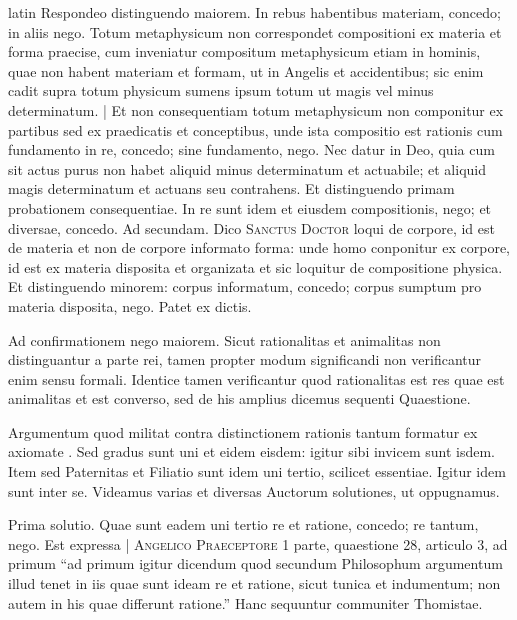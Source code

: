 \begin{otherlanguage*}{latin}
\pstart
Respondeo distinguendo maiorem. In rebus habentibus materiam, concedo; in aliis nego. Totum metaphysicum non correspondet compositioni ex materia et forma praecise, cum inveniatur compositum metaphysicum etiam in hominis, quae non habent materiam et formam, ut in Angelis et accidentibus; sic enim cadit supra totum physicum sumens ipsum totum ut magis vel minus determinatum. \textnormal{|} Et non consequentiam totum metaphysicum non componitur ex partibus sed ex praedicatis et conceptibus, unde ista compositio est rationis cum fundamento in re, concedo; sine fundamento, nego. Nec datur in Deo, quia cum sit actus purus non habet aliquid minus determinatum et actuabile; et aliquid magis determinatum et actuans seu contrahens. Et distinguendo primam probationem consequentiae. In re sunt idem et eiusdem compositionis, nego; et diversae, concedo. Ad secundam. Dico \textsc{Sanctus Doctor} loqui de corpore, id est de materia et non de corpore informato forma:
unde homo conponitur ex corpore, id est ex materia disposita et organizata et sic loquitur de compositione physica. Et distinguendo minorem:
corpus informatum, concedo; corpus sumptum pro materia disposita, nego. Patet ex dictis. 
\pend

\pstart
Ad confirmationem nego maiorem. Sicut rationalitas et animalitas non distinguantur a parte rei, tamen propter modum significandi non verificantur enim sensu formali. Identice tamen verificantur quod rationalitas est res quae est animalitas et est converso, sed de his amplius dicemus sequenti Quaestione. 
\pend

\pstart
{}
\pend

\pstart
Argumentum quod militat contra distinctionem rationis tantum formatur ex axiomate . Sed gradus sunt uni et eidem eisdem:
igitur sibi invicem sunt isdem. Item sed Paternitas et Filiatio sunt idem uni tertio, scilicet essentiae. Igitur idem sunt inter se. Videamus varias et diversas Auctorum solutiones, ut oppugnamus. 
\pend

\pstart
Prima solutio. Quae sunt eadem uni tertio re et ratione, concedo; re tantum, nego. Est expressa \textnormal{|} \textsc{Angelico Praeceptore} 1 parte, quaestione 28, articulo 3, ad primum \enquote{ad primum igitur dicendum quod secundum Philosophum argumentum illud tenet in iis quae sunt ideam re et ratione, sicut tunica et indumentum; non autem in his quae differunt ratione.} Hanc sequuntur communiter Thomistae. 
\pend


\end{otherlanguage*}
